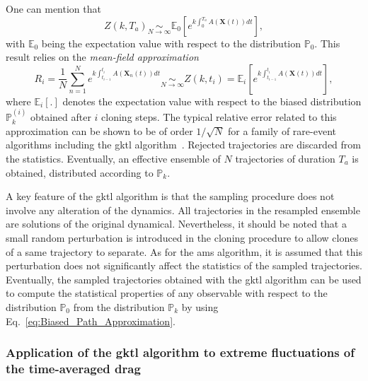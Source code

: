 \documentclass[pre,aps,floatfix,10pt,superscriptaddress, notitlepage,preprint]{revtex4-1}
\begin{document}
%
One can mention that
\begin{equation}
  \label{eq:mean_field}
  Z(k,T_a) \underset{N\to \infty}{\sim} \mathbb{E}_0\left[e^{k\int_{0}^{T_{a}}A(\mathbf{X}(t))dt}\right],
\end{equation}
with $\mathbb{E}_{0}$ being the expectation value with respect to the
distribution $\mathbb{P}_{0}$.
This result relies on the \textit{mean-field approximation}
\begin{equation}
R_{i}=\frac{1}{N}\sum_{n=1}^{N}e^{k\int_{t_{i-1}}^{t_{i}}A(\mathbf{X}_{n}(t))dt}\underset{N\rightarrow\infty}{\sim} Z(k,t_i)= \mathbb{E}_{i}\left[e^{k\int_{t_{i-1}}^{t_{i}}A(\mathbf{X}(t))dt}\right],
\label{eq:Mean_Field_Approximation}
\end{equation}
where $\mathbb{E}_{i}[.]$ denotes the expectation value with respect to the biased distribution $\mathbb{P}_k^{(i)}$ obtained after $i$ cloning steps.
The typical relative error related to this approximation can be shown to be of order $1/\sqrt{N}$ for a family of rare-event algorithms including the \ac{gktl} algorithm~\cite{DelMoralBook,DelMoral2013}.
%
Rejected trajectories are discarded from the statistics.
Eventually, an effective ensemble of $N$ trajectories of duration $T_{a}$ is obtained, distributed according to $\mathbb{P}_{k}$.

A key feature of the \ac{gktl} algorithm is that the sampling procedure does not involve any alteration of the dynamics. All trajectories in the resampled ensemble are solutions of the original dynamical. 
{Nevertheless, it should be noted that a small random perturbation is introduced in the cloning procedure to allow clones of a same trajectory to separate. 
As for the \ac{ams} algorithm, it is assumed that this perturbation does not significantly affect the statistics of the sampled trajectories.}
% 
%
%
Eventually, the sampled trajectories obtained with the \ac{gktl} algorithm can be used to compute the statistical properties of any observable with respect to the distribution $\mathbb{P}_{0}$ from the distribution $\mathbb{P}_{k}$ by using Eq.~\eqref{eq:Biased_Path_Approximation}.
%


\subsubsection{Application of the \ac{gktl} algorithm to extreme fluctuations of the time-averaged drag}
\label{sec:gktl_drag}
\end{document}
